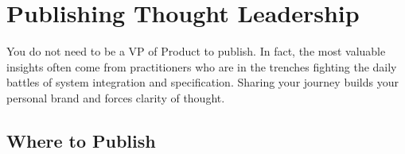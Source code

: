 \bigskip

\section{Publishing Thought
Leadership}\label{publishing-thought-leadership}

You do not need to be a VP of Product to publish. In fact, the most
valuable insights often come from practitioners who are in the trenches
fighting the daily battles of system integration and specification.
Sharing your journey builds your personal brand and forces clarity of
thought.

\subsection{Where to Publish}\label{where-to-publish}

